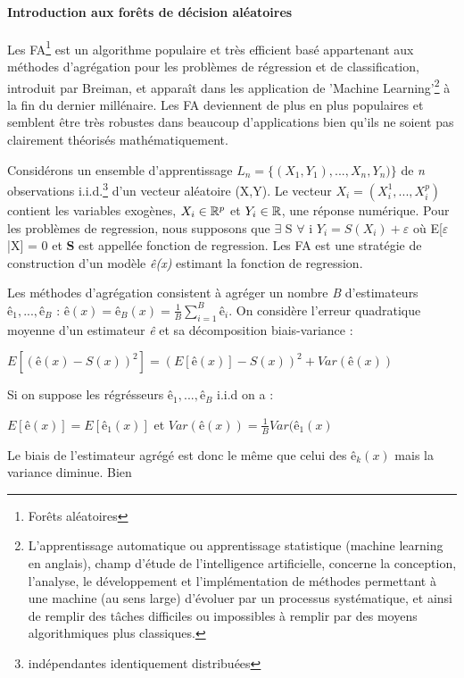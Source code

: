 	\paragraph{Introduction aux forêts de décision aléatoires\newline}
	Les FA\footnote{Forêts aléatoires} est un algorithme populaire et très efficient basé appartenant aux méthodes d'agrégation pour les problèmes de régression et de classification, introduit par Breiman\cite{BREI01}, et apparaît dans les application de 'Machine Learning'\footnote{L'apprentissage automatique ou apprentissage statistique (machine learning en anglais), champ d'étude de l'intelligence artificielle, concerne la conception, l'analyse, le développement et l'implémentation de méthodes permettant à une machine (au sens large) d'évoluer par un processus systématique, et ainsi de remplir des tâches difficiles ou impossibles à remplir par des moyens algorithmiques plus classiques.} à la fin du dernier millénaire\cite{DITRI99}. Les FA deviennent de plus en plus populaires et semblent être très robustes dans beaucoup d'applications bien qu'ils ne soient pas clairement théorisés mathématiquement\cite{BIA08}.
	\par
	Considérons un ensemble d'apprentissage ${L_n = \{(X_1, Y_1),...,X_n, Y_n)\}}$ de \textit{n} observations i.i.d.\footnote{indépendantes identiquement distribuées} d'un vecteur aléatoire (X,Y). Le vecteur ${X_i = (X_i^1,...,X_i^p)}$ contient les variables exogènes, $X_i \in \mathbb{R}^p $ et $Y_i \in \mathbb{R} $, une réponse numérique. Pour les problèmes de regression, nous supposons que $ \exists$ S $\forall$ i $ Y_i=S(X_i)+\varepsilon$ où E[$\varepsilon$|X] = 0 et \textbf{S} est appellée fonction de regression. Les FA est une stratégie de construction d'un modèle \textit{ê(x)} estimant la fonction de regression.
	\par
	Les méthodes d’agrégation consistent à agréger un nombre \textit{B} d’estimateurs $ê_1,...,ê_\textit{B}$ : ${ê(x) = ê_B(x) =  \frac{1}{B} \sum_{i=1}^{B} ê_i}$. On considère l’erreur quadratique moyenne d’un estimateur \textit{ê} et sa décomposition biais-variance :
	\begin{center}
	${E[(ê(x)-S(x))^2] = (E[ê(x)] - S(x))^2 + Var(ê(x))}$
	\end{center}
	Si on suppose les régrésseurs $ê_1,...,ê_B$ i.i.d on a :
	\begin{center}
		$E[ê(x)] = E[ê_1(x)]$ et $Var(ê(x)) = \frac{1}{B} Var(ê_1(x)$
	\end{center}
	Le biais de l’estimateur agrégé est donc le même que celui des $ê_k(x)$ mais la variance diminue. Bien
